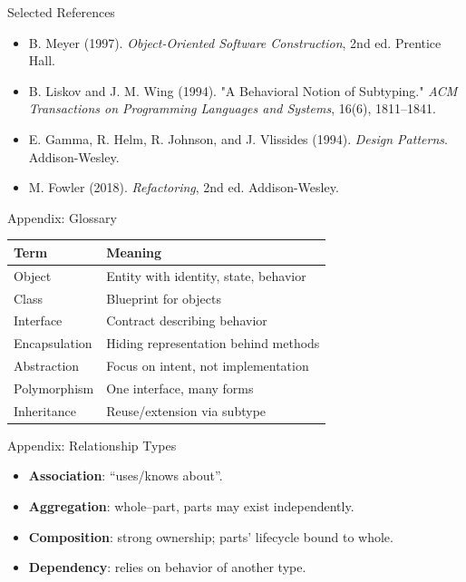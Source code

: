 \documentclass[aspectratio=169,11pt]{beamer}
\begin{document}
\begin{frame}{Selected References}
  \small
  \begin{itemize}
    \item B. Meyer (1997). \textit{Object-Oriented Software Construction}, 2nd ed. Prentice Hall.
    \item B. Liskov and J. M. Wing (1994). "A Behavioral Notion of Subtyping." \textit{ACM Transactions on Programming Languages and Systems}, 16(6), 1811--1841.
    \item E. Gamma, R. Helm, R. Johnson, and J. Vlissides (1994). \textit{Design Patterns}. Addison-Wesley.
    \item M. Fowler (2018). \textit{Refactoring}, 2nd ed. Addison-Wesley.
  \end{itemize}
\end{frame}

\contactslide

\appendix


\begin{frame}{Appendix: Glossary}
\begin{tabular}{@{}ll@{}}
\toprule
Term & Meaning \\
\midrule
Object & Entity with identity, state, behavior \\
Class & Blueprint for objects \\
Interface & Contract describing behavior \\
Encapsulation & Hiding representation behind methods \\
Abstraction & Focus on intent, not implementation \\
Polymorphism & One interface, many forms \\
Inheritance & Reuse/extension via subtype \\
\bottomrule
\end{tabular}
\end{frame}

\begin{frame}{Appendix: Relationship Types}
  \begin{itemize}
    \item \textbf{Association}: “uses/knows about”.
    \item \textbf{Aggregation}: whole–part, parts may exist independently.
    \item \textbf{Composition}: strong ownership; parts’ lifecycle bound to whole.
    \item \textbf{Dependency}: relies on behavior of another type.
  \end{itemize}
\end{frame}
\end{document}
